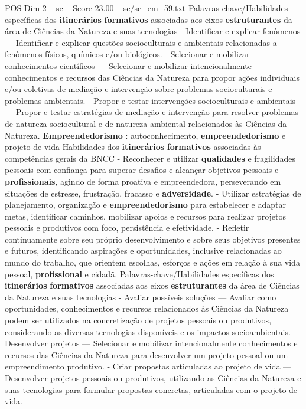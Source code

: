 \begin{textsample}{POS Dim 2 – sc – Score 23.00 – sc/sc\_em\_59.txt}
Palavras-chave/Habilidades específicas dos \textbf{itinerários} \textbf{formativos} associadas aos eixos \textbf{estruturantes} da área de Ciências da Natureza e suas tecnologias - Identificar e explicar fenômenos — Identificar e explicar questões socioculturais e ambientais relacionadas a fenômenos físicos, químicos e/ou biológicos. - Selecionar e mobilizar conhecimentos científicos — Selecionar e mobilizar intencionalmente conhecimentos e recursos das Ciências da Natureza para propor ações individuais e/ou coletivas de mediação e intervenção sobre problemas socioculturais e problemas ambientais. - Propor e testar intervenções socioculturais e ambientais — Propor e testar estratégias de mediação e intervenção para resolver problemas de natureza sociocultural e de natureza ambiental relacionados às Ciências da Natureza. \textbf{Empreendedorismo} : autoconhecimento, \textbf{empreendedorismo} e projeto de vida Habilidades dos \textbf{itinerários} \textbf{formativos} associadas às competências gerais da BNCC - Reconhecer e utilizar \textbf{qualidades} e fragilidades pessoais com confiança para superar desafios e alcançar objetivos pessoais e \textbf{profissionais}, agindo de forma proativa e empreendedora, perseverando em situações de estresse, frustração, fracasso e \textbf{adversidade}. - Utilizar estratégias de planejamento, organização e \textbf{empreendedorismo} para estabelecer e adaptar metas, identificar caminhos, mobilizar apoios e recursos para realizar projetos pessoais e produtivos com foco, persistência e efetividade. - Refletir continuamente sobre seu próprio desenvolvimento e sobre seus objetivos presentes e futuros, identificando aspirações e oportunidades, inclusive relacionadas ao mundo do trabalho, que orientem escolhas, esforços e ações em relação à sua vida pessoal, \textbf{profissional} e cidadã.
Palavras-chave/Habilidades específicas dos \textbf{itinerários} \textbf{formativos} associadas aos eixos \textbf{estruturantes} da área de Ciências da Natureza e suas tecnologias - Avaliar possíveis soluções — Avaliar como oportunidades, conhecimentos e recursos relacionados às Ciências da Natureza podem ser utilizados na concretização de projetos pessoais ou produtivos, considerando as diversas tecnologias disponíveis e os impactos socioambientais. - Desenvolver projetos — Selecionar e mobilizar intencionalmente conhecimentos e recursos das Ciências da Natureza para desenvolver um projeto pessoal ou um empreendimento produtivo. - Criar propostas articuladas ao projeto de vida — Desenvolver projetos pessoais ou produtivos, utilizando as Ciências da Natureza e suas tecnologias para formular propostas concretas, articuladas com o projeto de vida.

\end{textsample}
